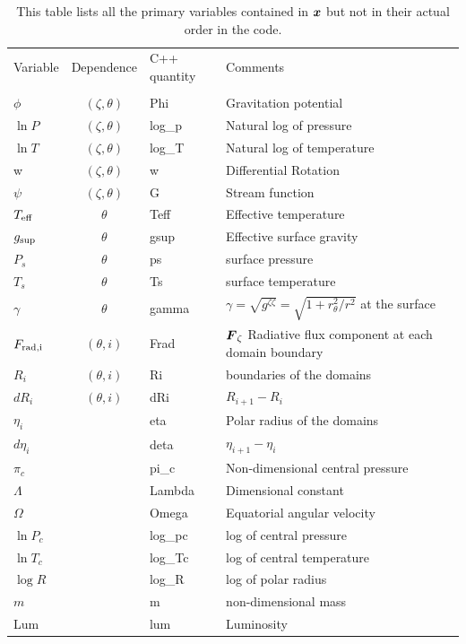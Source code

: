 \begin{table}
\begin{center}
\begin{tabular}{lcll}
\hline
Variable & Dependence & C++ quantity & Comments \\
\\
$\phi$   & $(\zeta,\theta)$ &  Phi & Gravitation potential \\
$\ln P$  & $(\zeta,\theta)$ &  log\_p & Natural log of pressure     \\
$\ln T$  & $(\zeta,\theta)$ &  log\_T & Natural log of temperature  \\
   w     &  $(\zeta,\theta)$ &   w  & Differential Rotation    \\
$\psi$   &  $(\zeta,\theta)$ &   G  & Stream function    \\
$T_{\rm eff}$ & $\theta$ &  Teff  &  Effective temperature  \\
$g_{\rm sup}$ & $\theta$ &  gsup  &  Effective surface gravity  \\
$P_s$    &  $\theta$  &ps    &  surface pressure \\
$T_s$    &  $\theta$  &Ts    &  surface temperature \\
$\gamma$ &  $\theta$    & gamma    &
$\gamma=\sqrt{g^{\zeta\zeta}}=\sqrt{1+r_\theta^2/r^2}$ at the surface \\
$F_{\rm rad,i}$ &  $(\theta, i)$ &  Frad & $\vF_\zeta$ Radiative flux
component at each domain boundary\\
$R_i$    &  $(\theta,i)$       &   Ri & boundaries of the domains \\
$dR_i$   &  $(\theta,i)$       &   dRi& $R_{i+1}-R_i$      \\
$\eta_i$ &                   &   eta& Polar radius of the domains \\
$d\eta_i$&                   &  deta& $\eta_{i+1}-\eta_i$      \\
$\pi_c$  &                  &  pi\_c &  Non-dimensional central pressure \\
$\Lambda$&                  &  Lambda &   Dimensional constant  \\
$\Omega$ &                  &  Omega  &   Equatorial angular velocity \\
$\ln P_c$&                  & log\_pc &   log of central pressure  \\
$\ln T_c$&                  & log\_Tc &   log of central temperature  \\
$\log R$ &                  &log\_R  &   log of polar radius \\
$m$      &                  &       m     & non-dimensional mass\\
Lum      &                  &  lum   &  Luminosity  \\
      \hline
\end{tabular}
\end{center}
\caption[]
{This table lists all the primary variables contained in $\vx$ but not
in their actual order in the code.}
\end{table}

